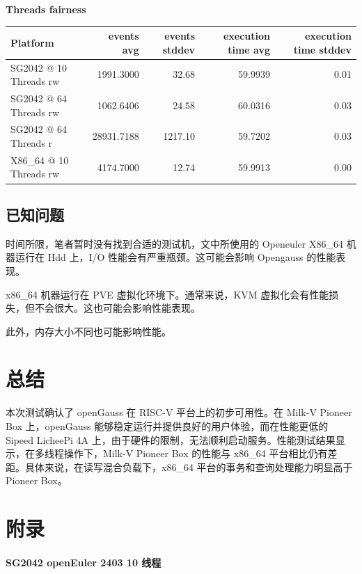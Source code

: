\documentclass{article}
\begin{document}
\textbf{Threads fairness}

\begin{table}[h]
\centering
\begin{tabular}{|l|r|r|r|r|}
\hline
Platform & events avg & events stddev & execution time avg & execution time stddev \\
\hline
SG2042 @ 10 Threads rw & 1991.3000 & 32.68 & 59.9939 & 0.01 \\
SG2042 @ 64 Threads rw & 1062.6406 & 24.58 & 60.0316 & 0.03 \\
SG2042 @ 64 Threads r & 28931.7188 & 1217.10 & 59.7202 & 0.03 \\
X86\_64 @ 10 Threads rw & 4174.7000 & 12.74 & 59.9913 & 0.00 \\
\hline
\end{tabular}
\end{table}

\subsection{已知问题}

时间所限，笔者暂时没有找到合适的测试机，文中所使用的 Openeuler X86\_64 机器运行在 Hdd 上，I/O 性能会有严重瓶颈。这可能会影响 Opengauss 的性能表现。

x86\_64 机器运行在 PVE 虚拟化环境下。通常来说，KVM 虚拟化会有性能损失，但不会很大。这也可能会影响性能表现。

此外，内存大小不同也可能影响性能。

\section{总结}

本次测试确认了 openGauss 在 RISC-V 平台上的初步可用性。在 Milk-V Pioneer Box 上，openGauss 能够稳定运行并提供良好的用户体验，而在性能更低的 Sipeed LicheePi 4A 上，由于硬件的限制，无法顺利启动服务。性能测试结果显示，在多线程操作下，Milk-V Pioneer Box 的性能与 x86\_64 平台相比仍有差距。具体来说，在读写混合负载下，x86_64 平台的事务和查询处理能力明显高于 Pioneer Box。

\newpage
\appendix

\section{附录}

\paragraph{SG2042 openEuler 2403 10 线程}
\end{document}
